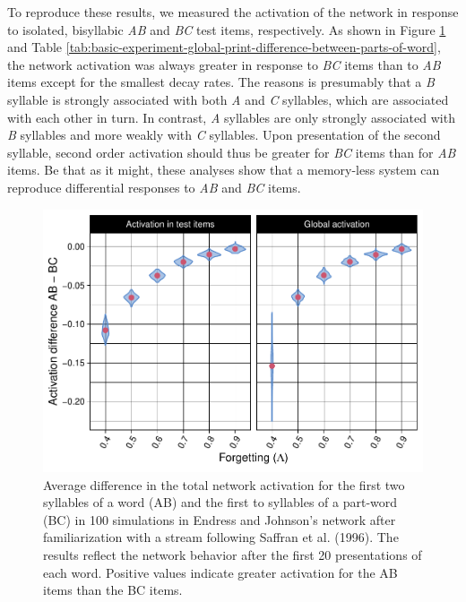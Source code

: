 \documentclass[
]{article}
\begin{document}
To reproduce these results, we measured the activation of the network in
response to isolated, bisyllabic \emph{AB} and \emph{BC} test items,
respectively. As shown in Figure
\ref{fig:basic-experiment-global-print-act-after-2syll-plot} and Table
\ref{tab:basic-experiment-global-print-difference-between-parts-of-word},
the network activation was always greater in response to \emph{BC} items
than to \emph{AB} items except for the smallest decay rates. The reasons
is presumably that a \emph{B} syllable is strongly associated with both
\emph{A} and \emph{C} syllables, which are associated with each other in
turn. In contrast, \emph{A} syllables are only strongly associated with
\emph{B} syllables and more weakly with \emph{C} syllables. Upon
presentation of the second syllable, second order activation should thus
be greater for \emph{BC} items than for \emph{AB} items. Be that as it
might, these analyses show that a memory-less system can reproduce
differential responses to \emph{AB} and \emph{BC} items.

\begin{figure}
\includegraphics[width=1\linewidth]{tp_model_entrainment_files/figure-latex/basic-experiment-global-print-act-after-2syll-plot-1} \caption{Average difference in the total network activation for the first two syllables of a word (AB) and the first to syllables of a part-word (BC)  in 100 simulations in Endress and Johnson's network after  familiarization with a stream following Saffran et al. (1996). The results reflect the network behavior after the first 20 presentations of each word. Positive values indicate greater activation for the AB items than the BC items.}\label{fig:basic-experiment-global-print-act-after-2syll-plot}
\end{figure}
\end{document}
